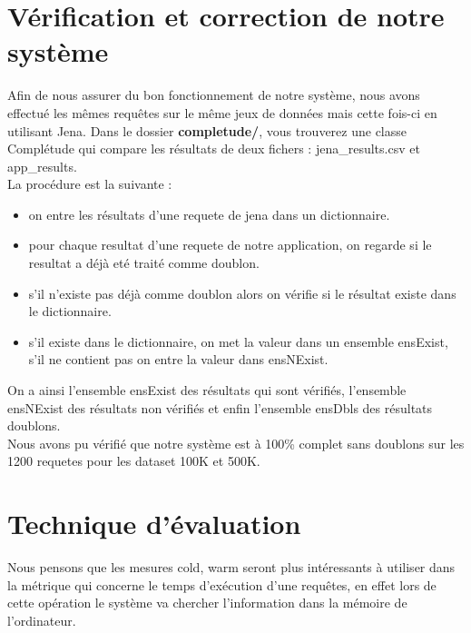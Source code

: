 \documentclass[12pt]{report}
\begin{document}
\section{Vérification et correction de notre système}
Afin de nous assurer du bon fonctionnement de notre système, nous avons effectué les mêmes requêtes sur le même jeux de données mais cette fois-ci en utilisant Jena. Dans le dossier \textbf{completude/}, vous trouverez une classe Complétude qui compare les résultats de deux fichers : jena\_results.csv et app\_results.\\

La procédure est la suivante :
\begin{itemize}
\item on entre les résultats d'une requete de jena dans un dictionnaire.
\item pour chaque resultat d'une requete de notre application, on regarde si le resultat a déjà eté traité comme doublon.
\item s'il n'existe pas déjà comme doublon alors on vérifie si le résultat existe dans le dictionnaire.
\item s'il existe dans le dictionnaire, on met la valeur dans un ensemble ensExist, s'il ne contient pas on entre la valeur dans ensNExist.\\
\end{itemize}

On a ainsi l'ensemble ensExist des résultats qui sont vérifiés, l'ensemble ensNExist des résultats non vérifiés et enfin l'ensemble ensDbls des résultats doublons.\\

Nous avons pu vérifié que notre système est à 100\% complet sans doublons sur les 1200 requetes pour les dataset 100K et 500K.


\section{Technique d’évaluation}

Nous pensons que les mesures cold, warm seront plus intéressants à utiliser dans la métrique qui concerne le temps d’exécution d’une requêtes, en effet lors de cette opération le système va chercher l’information dans la mémoire de l’ordinateur. 
\end{document}
